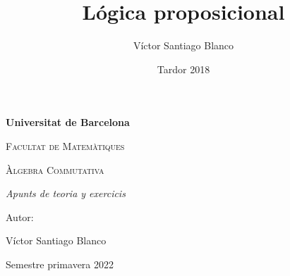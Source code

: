 \documentclass[titlepage, main=catalan, 11pt]{book}
\title{Lógica proposicional}
\author{Víctor Santiago Blanco}
\date{Tardor 2018}
\theoremstyle{definition}
\theoremstyle{plain}
\theoremstyle{remark}
\begin{document}





\begin{titlepage}
    \centering
    {\bfseries\LARGE Universitat de Barcelona \par}
    \vspace{1cm}
    {\scshape\Large Facultat de Matemàtiques \par}
    \vspace{3cm}
    {\scshape\Huge Àlgebra Commutativa \par}
    \vspace{3cm}
    {\itshape\Large Apunts de teoria y exercicis \par}
    \vfill
    {\Large Autor: \par}
    {\Large Víctor Santiago Blanco \par}
    \vfill
    {\Large Semestre primavera 2022 \par}
    \end{titlepage}

\newpage



\tableofcontents
\newpage





\printindex
\end{document}
